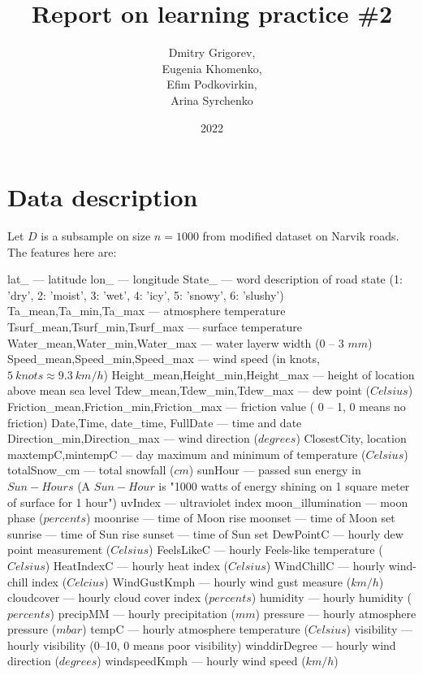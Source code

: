 \documentclass[12pt, bachelor, substylefile = algo_title.rtx]{disser}
\theoremstyle{definition}
\begin{document}
\title{Report on learning practice \#2}


\author{Dmitry Grigorev,\\ Eugenia Khomenko,\\ Efim Podkovirkin,\\ Arina Syrchenko}

\date{2022}

\maketitle

\tableofcontents

\section{Data description}

Let $D$ is a subsample on size $n = 1000$ from modified dataset on Narvik roads. The features here are:

\begin{outline}
\1lat\_ — latitude
\1 lon\_ — longitude
\1 State\_ — word description of road state (1: 'dry', 2: 'moist', 3: 'wet', 4: 'icy', 5: 'snowy', 6: 'slushy')
\1 Ta\_mean,Ta\_min,Ta\_max — atmosphere temperature
\1 Tsurf\_mean,Tsurf\_min,Tsurf\_max — surface temperature
\1 Water\_mean,Water\_min,Water\_max — water layerw width (0 -- 3 $mm$)
\1 Speed\_mean,Speed\_min,Speed\_max — wind speed (in knots, $5\ knots \approx 9.3\ km/h$)
\1 Height\_mean,Height\_min,Height\_max — height of location above mean sea level
\1 Tdew\_mean,Tdew\_min,Tdew\_max — dew point ($Celsius$)
\1 Friction\_mean,Friction\_min,Friction\_max — friction value ( 0 -- 1, 0 means no friction)
\1 Date,Time, date\_time, FullDate — time and date
\1 Direction\_min,Direction\_max — wind direction ($degrees$)
\1 ClosestCity, location
\1 maxtempC,mintempC — day maximum and minimum of temperature ($Celsius$)
\1 totalSnow\_cm — total snowfall ($cm$)
\1 sunHour — passed sun energy in $Sun-Hours$ (A $Sun-Hour$ is "1000 watts of energy shining on 1 square meter of surface for 1 hour")
\1 uvIndex — ultraviolet index
\1 moon\_illumination — moon phase ($percents$)
\1 moonrise — time of Moon rise
\1 moonset — time of Moon set
\1 sunrise — time of Sun rise
\1 sunset — time of Sun set
\1 DewPointC — hourly dew point measurement ($Celsius$)
\1 FeelsLikeC — hourly Feels-like temperature ($Celsius$)
\1 HeatIndexC — hourly heat index ($Celsius$)
\1 WindChillC — hourly wind-chill index ($Celcius$) 
\1 WindGustKmph — hourly wind gust measure ($km/h$)
\1 cloudcover — hourly cloud cover index ($percents$)
\1 humidity — hourly humidity ($percents$)
\1 precipMM — hourly precipitation ($mm$)
\1 pressure — hourly atmosphere pressure ($mbar$)
\1 tempC — hourly atmosphere temperature ($Celsius$)
\1 visibility — hourly visibility (0--10, 0 means poor visibility)
\1 winddirDegree — hourly wind direction ($degrees$)
\1 windspeedKmph — hourly wind speed ($km/h$)
\end{outline}
\end{document}
